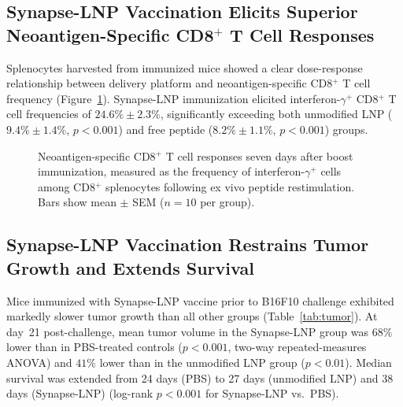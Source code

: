 \subsection{Synapse-LNP Vaccination Elicits Superior Neoantigen-Specific CD8$^{+}$ T Cell Responses}

Splenocytes harvested from immunized mice showed a clear dose-response relationship between delivery platform and neoantigen-specific CD8$^{+}$ T cell frequency (Figure~\ref{fig:tcell}). Synapse-LNP immunization elicited interferon-$\gamma^{+}$ CD8$^{+}$ T cell frequencies of $24.6\% \pm 2.3\%$, significantly exceeding both unmodified LNP ($9.4\% \pm 1.4\%$, $p < 0.001$) and free peptide ($8.2\% \pm 1.1\%$, $p < 0.001$) groups.

\begin{figure}[htbp]
\centering
{}
\caption{Neoantigen-specific CD8$^{+}$ T cell responses seven days after boost immunization, measured as the frequency of interferon-$\gamma^{+}$ cells among CD8$^{+}$ splenocytes following ex vivo peptide restimulation. Bars show mean $\pm$ SEM ($n = 10$ per group).}
\label{fig:tcell}
\end{figure}

\subsection{Synapse-LNP Vaccination Restrains Tumor Growth and Extends Survival}

Mice immunized with Synapse-LNP vaccine prior to B16F10 challenge exhibited markedly slower tumor growth than all other groups (Table~\ref{tab:tumor}). At day~21 post-challenge, mean tumor volume in the Synapse-LNP group was $68\%$ lower than in PBS-treated controls ($p < 0.001$, two-way repeated-measures ANOVA) and $41\%$ lower than in the unmodified LNP group ($p < 0.01$). Median survival was extended from 24 days (PBS) to 27 days (unmodified LNP) and 38 days (Synapse-LNP) (log-rank $p < 0.001$ for Synapse-LNP vs.\ PBS).

